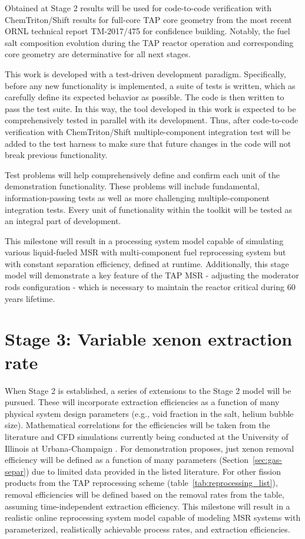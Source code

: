 Obtained at Stage 2 results will be used for code-to-code verification with  
ChemTriton/Shift results for full-core \gls{TAP} core geometry from the most 
recent \gls{ORNL} technical report TM-2017/475 \cite{betzler_assessment_2017} 
for confidence building. Notably, the fuel salt composition evolution during 
the \gls{TAP} reactor operation and corresponding core geometry are 
determinative for all next stages.

This work is developed with a test-driven development paradigm. Specifically, 
before any new functionality is implemented, a suite of tests is written, 
which as carefully define its expected behavior as possible. The code is then 
written to pass the test suite. In this way, the tool developed in this work 
is expected to be comprehensively tested in parallel with its development. 
Thus, after code-to-code verification with ChemTriton/Shift multiple-component 
integration test will be added to the test harness to make sure that future 
changes in the code will not break previous functionality.

Test problems will help comprehensively define and confirm each unit of the 
demonstration functionality. These problems will include fundamental, 
information-passing tests as well as more challenging multiple-component 
integration tests. Every unit of functionality within the toolkit will be 
tested as an integral part of development.

This milestone will result in a processing system model capable of simulating
various liquid-fueled \gls{MSR} with multi-component fuel reprocessing system 
but with constant separation efficiency, defined at runtime. Additionally, 
this stage model will demonstrate a key feature of the \gls{TAP} \gls{MSR} - 
adjusting the moderator rods configuration - which is necessary to maintain 
the reactor critical during 60 years lifetime. 

\section{Stage 3: Variable xenon extraction rate}
When Stage 2 is established, a series of extensions to the Stage 2 model will 
be pursued. These will incorporate extraction efficiencies as a function of 
many physical system design parameters (e.g., void fraction in the salt, 
helium bubble size). Mathematical correlations for the efficiencies will be 
taken from the literature \cite{peebles_removal_1968, 
gabbard_development_1974} and CFD simulations currently being conducted 
at the University of Illinois at Urbana-Champaign \cite{huff_enabling_2018}. 
For demonstration proposes, just xenon removal efficiency will be defined as a 
function of many parameters (Section~\ref{sec:gas-separ}) due to 
limited data provided in the listed literature. For other fission products  
from the \gls{TAP} reprocessing scheme (table~\ref{tab:reprocessing_list}), 
removal efficiencies will be defined based on the removal rates from the 
table, assuming time-independent extraction efficiency. This milestone will 
result in a realistic online reprocessing system model capable of modeling 
\gls{MSR} systems with parameterized, realistically achievable process rates,  
and extraction efficiencies.

